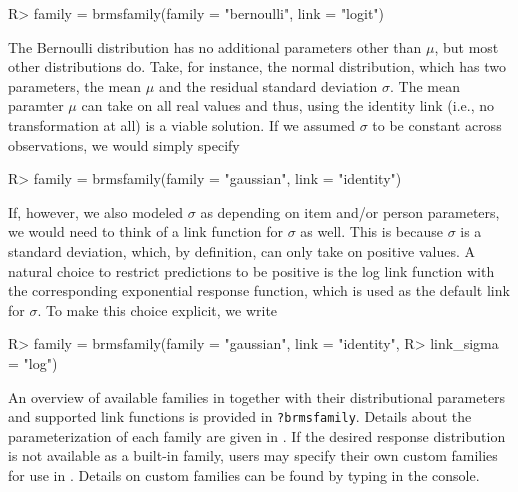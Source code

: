 \documentclass[
]{jss}
\begin{document}
\begin{CodeChunk}

\begin{CodeInput}
R> family = brmsfamily(family = "bernoulli", link = "logit")
\end{CodeInput}
\end{CodeChunk}

The Bernoulli distribution has no additional parameters other than
\(\mu\), but most other distributions do. Take, for instance, the normal
distribution, which has two parameters, the mean \(\mu\) and the
residual standard deviation \(\sigma\). The mean paramter \(\mu\) can
take on all real values and thus, using the identity link (i.e., no
transformation at all) is a viable solution. If we assumed \(\sigma\) to
be constant across observations, we would simply specify

\begin{CodeChunk}

\begin{CodeInput}
R> family = brmsfamily(family = "gaussian", link = "identity")
\end{CodeInput}
\end{CodeChunk}

If, however, we also modeled \(\sigma\) as depending on item and/or
person parameters, we would need to think of a link function for
\(\sigma\) as well. This is because \(\sigma\) is a standard deviation,
which, by definition, can only take on positive values. A natural choice
to restrict predictions to be positive is the log link function with the
corresponding exponential response function, which is used as the
default link for \(\sigma\). To make this choice explicit, we write

\begin{CodeChunk}

\begin{CodeInput}
R> family = brmsfamily(family = "gaussian", link = "identity",
R>                     link_sigma = "log")
\end{CodeInput}
\end{CodeChunk}

An overview of available families in  together with their
distributional parameters and supported link functions is provided in
\texttt{?brmsfamily}. Details about the parameterization of each family
are given in . If the desired response
distribution is not available as a built-in family, users may specify
their own custom families for use in . Details on custom
families can be found by typing 
in the console.
\end{document}
